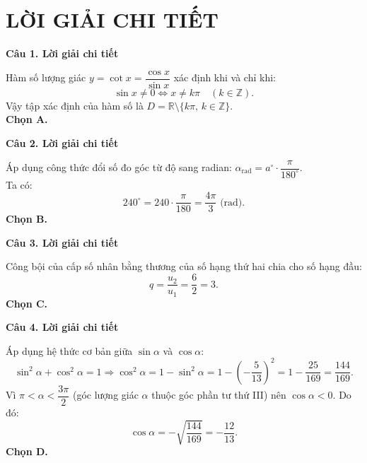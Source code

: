 \documentclass[12pt, a4paper]{article}
\begin{document}
\section*{LỜI GIẢI CHI TIẾT}

\noindent\textbf{Câu 1. Lời giải chi tiết}\par
\begin{tcolorbox}[enhanced,breakable,colback=solutionbg,colframe=secondary!50!black,frame hidden,borderline west={3pt}{0pt}{secondary!50!black}]
Hàm số lượng giác $y = \cot x = \dfrac{\cos x}{\sin x}$ xác định khi và chỉ khi:
$$\sin x \ne 0 \Leftrightarrow x \ne k\pi\quad (k\in\mathbb{Z}).$$
Vậy tập xác định của hàm số là $D = \mathbb{R}\setminus\{k\pi,\, k\in\mathbb{Z}\}$.\\
\textbf{Chọn A.}
\end{tcolorbox}

\noindent\textbf{Câu 2. Lời giải chi tiết}\par
\begin{tcolorbox}[enhanced,breakable,colback=solutionbg,colframe=secondary!50!black,frame hidden,borderline west={3pt}{0pt}{secondary!50!black}]
Áp dụng công thức đổi số đo góc từ độ sang radian: $\alpha_{\text{rad}} = a^\circ \cdot \dfrac{\pi}{180^\circ}$.\\
Ta có:
$$240^\circ = 240 \cdot \dfrac{\pi}{180} = \dfrac{4\pi}{3}\text{ (rad)}.$$
\textbf{Chọn B.}
\end{tcolorbox}

\noindent\textbf{Câu 3. Lời giải chi tiết}\par
\begin{tcolorbox}[enhanced,breakable,colback=solutionbg,colframe=secondary!50!black,frame hidden,borderline west={3pt}{0pt}{secondary!50!black}]
Công bội của cấp số nhân bằng thương của số hạng thứ hai chia cho số hạng đầu:
$$q = \dfrac{u_2}{u_1} = \dfrac{6}{2} = 3.$$
\textbf{Chọn C.}
\end{tcolorbox}

\noindent\textbf{Câu 4. Lời giải chi tiết}\par
\begin{tcolorbox}[enhanced,breakable,colback=solutionbg,colframe=secondary!50!black,frame hidden,borderline west={3pt}{0pt}{secondary!50!black}]
Áp dụng hệ thức cơ bản giữa $\sin\alpha$ và $\cos\alpha$:
$$\sin^2\alpha + \cos^2\alpha = 1 \Rightarrow \cos^2\alpha = 1 - \sin^2\alpha = 1 - \left(-\dfrac{5}{13}\right)^2 = 1 - \dfrac{25}{169} = \dfrac{144}{169}.$$
Vì $\pi < \alpha < \dfrac{3\pi}{2}$ (góc lượng giác $\alpha$ thuộc góc phần tư thứ III) nên $\cos\alpha < 0$. Do đó:
$$\cos\alpha = -\sqrt{\dfrac{144}{169}} = -\dfrac{12}{13}.$$
\textbf{Chọn D.}
\end{tcolorbox}
\end{document}
